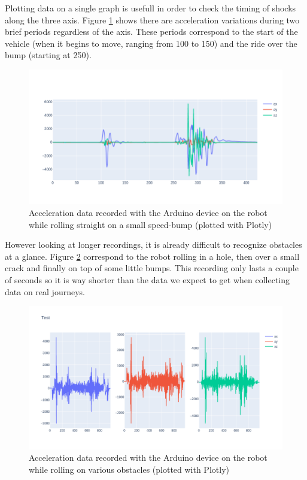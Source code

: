 Plotting data on a single graph is usefull in order to check the timing of shocks along the three axis. Figure \ref{bump_2} shows there are acceleration variations during two brief periods regardless of the axis. These periods correspond to the start of the vehicle (when it begins to move, ranging from 100 to 150) and the ride over the bump (starting at 250).\\

\begin{figure}
    \center
    \includegraphics[scale=.5]{img/DATA1_combined.png}
    \caption{Acceleration data recorded with the Arduino device on the robot while rolling straight on a small speed-bump (plotted with Plotly)}
    \label{bump_2}
\end{figure}

However looking at longer recordings, it is already difficult to recognize obstacles at a glance. Figure \ref{bump_3} correspond to the robot rolling in a hole, then over a small crack and finally on top of some little bumps. This recording only lasts a couple of seconds so it is way shorter than the data we expect to get when collecting data on real journeys.\\

\begin{figure}
    \center
    \includegraphics[scale=.5]{img/DATA9.png}
    \caption{Acceleration data recorded with the Arduino device on the robot while rolling on various obstacles (plotted with Plotly)}
    \label{bump_3}
\end{figure}

